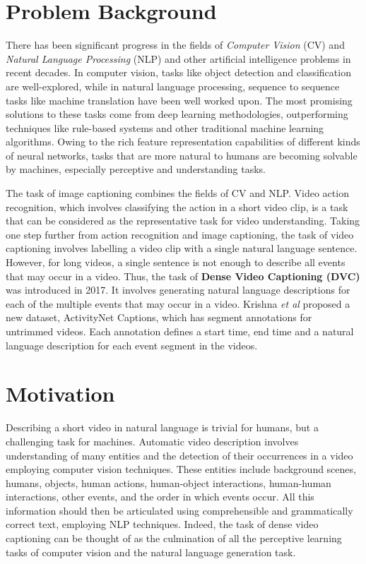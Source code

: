 \section{Problem Background}

\par There has been  significant progress in the fields of \textit{Computer Vision} (CV) and \textit{Natural Language Processing} (NLP) and other artificial intelligence problems in recent decades. In computer vision, tasks like object detection and classification are well-explored, while in natural language processing, sequence to sequence tasks like machine translation have been well worked upon. The most promising solutions to these tasks come from deep learning methodologies, outperforming techniques like rule-based systems and other traditional machine learning algorithms. Owing to the rich feature representation capabilities of different kinds of neural networks, tasks that are more natural to humans are becoming solvable by machines, especially perceptive and understanding tasks.

\par The task of image captioning combines the fields of CV and NLP. Video action recognition, which involves classifying the action in a short video clip, is a task that can be considered as the representative task for video understanding. Taking one step further from action recognition and image captioning, the task of video captioning involves labelling a video clip with a single natural language sentence. However, for long videos, a single sentence is not enough to describe all events that may occur in a video. Thus, the task of \textbf{Dense Video Captioning (DVC)} was introduced \cite{krishna2017densecaptioning} in 2017. It involves generating natural language descriptions for each of the multiple events that may occur in a video. Krishna \textit{et al} proposed a new dataset, ActivityNet Captions, which has segment annotations for untrimmed videos. Each annotation defines a start time, end time and a natural language description for each event segment in the videos.

\section{Motivation}
\par Describing a short video in natural language is trivial for humans, but a challenging task for machines. Automatic video description involves understanding of many entities and the detection of their occurrences in a video employing computer vision techniques. These entities include background scenes, humans, objects, human actions, human-object interactions, human-human interactions, other events, and the order in which events occur. All this information should then be articulated using comprehensible and grammatically correct text, employing NLP techniques\cite{aafaq2020video}. Indeed, the task of dense video captioning can be thought of as the culmination of all the perceptive learning tasks of computer vision and the natural language generation task.

